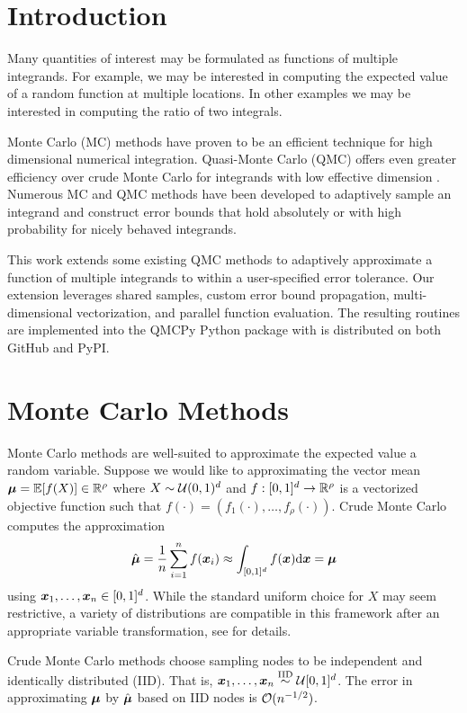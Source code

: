 \documentclass{article}[12pt]
\begin{document}
\section{Introduction}

Many quantities of interest may be formulated as functions of multiple integrands. For example, we may be interested in computing the expected value of a random function at multiple locations. In other examples we may be interested in computing the ratio of two integrals.

Monte Carlo (MC) methods have proven to be an efficient technique for high dimensional numerical integration. Quasi-Monte Carlo (QMC) offers even greater efficiency over crude Monte Carlo for integrands with low effective dimension . Numerous MC and QMC methods have been developed to adaptively sample an integrand and construct error bounds that hold absolutely or with high probability for nicely behaved integrands. 

This work extends some existing QMC methods to adaptively approximate a function of multiple integrands to within a user-specified error tolerance. Our extension leverages shared samples, custom error bound propagation, multi-dimensional vectorization, and parallel function evaluation. The resulting routines are implemented into the QMCPy Python package \cite{QMCPy} with is distributed on both GitHub and PyPI. 

\section{Monte Carlo Methods}

Monte Carlo methods are well-suited to approximate the expected value a random variable. Suppose we would like to approximating the vector mean $\boldsymbol{\mu} = \mathbb{E}[f(X)] \in \mathbb{R}^\rho$ where $X\sim\mathcal{U}(0,1)^d$ and  $f: [0,1]^d \to \mathbb{R}^\rho$ is a vectorized objective function such that $f(\cdot)=(f_1(\cdot),\dots,f_\rho(\cdot))$.  Crude Monte Carlo computes the approximation 
\begin{equation}
    \label{eq:mcapprox}
    \hat{\boldsymbol{\mu}} = \frac{1}{n}\sum_{i=1}^n f(\boldsymbol{x}_i) \approx \int_{[0,1]^d}f(\boldsymbol{x})\mathrm{d}\boldsymbol{x} = \boldsymbol{\mu}
\end{equation}
using $\boldsymbol{x}_1,\dots,\boldsymbol{x}_n \in [0,1]^d$. While the standard uniform choice for $X$ may seem restrictive, a variety of distributions are compatible in this framework after an appropriate variable transformation, see \cite{QMCSoftware} for details.

Crude Monte Carlo methods choose sampling nodes to be independent and identically distributed (IID). That is, $\boldsymbol{x}_1,\dots,\boldsymbol{x}_n \overset{\text{IID}}{\sim} \mathcal{U}[0,1]^d$.
The error in approximating $\boldsymbol{\mu}$ by $\hat{\boldsymbol{\mu}}$ based on IID nodes is  $\mathcal{O}(n^{-1/2})$. 
\end{document}

